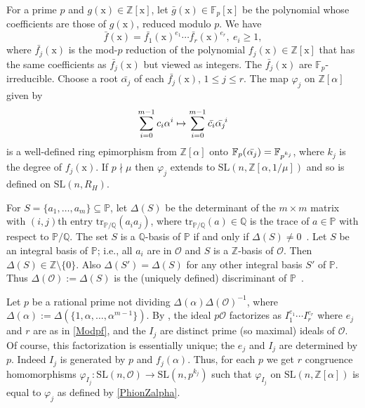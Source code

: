 \documentclass[11pt]{amsart}
\theoremstyle{definition}
\theoremstyle{remark}
\newcommand{\F}{\mathbb{F}}
\newcommand{\Z}{\mathbb{Z}}
\newcommand{\Q}{\mathbb{Q}}
\renewcommand{\P}{\mathbb{P}}
\newcommand{\SL}{\mathrm{SL}}
\newcommand{\tr}{\mathrm{tr}}
\begin{document}
For a prime $p$ and $g(\mathrm{x})\in \allowbreak\Z[\mathrm{x}]$, 
let $\bar{g}(\mathrm{x})\in \allowbreak\F_p[\mathrm{x}]$ be the
polynomial whose coefficients are those of $g(\mathrm{x})$,
reduced modulo $p$. We have 
\begin{equation}
\label{Modpf}
\bar{f}(\mathrm{x})=\allowbreak
 \bar{f_1}(\mathrm{x})^{e_1} \cdots \bar{f_r}(\mathrm{x})^{e_r}, \  
 e_i\geq 1, 
\end{equation} 
where $\bar{f_j}(\mathrm{x})$ is the mod-$p$ reduction of the 
polynomial $f_j(\mathrm{x}) \in 
\allowbreak \Z[\mathrm{x}]$ that has the same coefficients as 
$\bar{f_j}(\mathrm{x})$ but viewed as integers. 
The $\bar{f_j}(\mathrm{x})$ are $\F_p$-irreducible. Choose a root 
$\bar{\alpha_j}$ of each $\bar{f_j}(\mathrm{x})$, $1\leq j \leq r$. 
The map $\varphi_j$ on $\Z[\alpha]$ given by
\begin{equation}
\label{PhionZalpha}
\sum_{i=0}^{m-1}c_i\alpha^i \mapsto
 \sum_{i=0}^{m-1}\bar{c_i}   \bar{\alpha_j}^{\hspace{-1pt} i}
\end{equation}
is a well-defined ring epimorphism from $\Z[\alpha]$ onto 
$\F_p( \hspace{.5pt} \bar{\alpha_j}) = \F_{p^{k_j}}$, where $k_j$ 
is the degree of $f_j(\mathrm{x})$. If $p\nmid \mu$ then 
$\varphi_j$ extends to $\SL(n,\Z[\alpha, 1/\mu])$ and so is 
defined on $\SL(n,R_H)$.

For $S=\{a_1, \ldots , a_m\} \subseteq\P$, let $\Delta(S)$ be the determinant 
of the  $m \times m$ matrix with $(i,j)$th entry $\tr_{\P/\Q}(a_ia_j)$, where 
$\tr_{\P/\Q}(a)\in \Q$ is the trace of $a \in \P$ with respect to $\P/\Q$. The set 
$S$ is a $\Q$-basis of $\P$ if and only if $\Delta(S) \neq 0$~\cite[p.~342]{Koch}.
 Let $S$ be an integral basis of $\P$; i.e., all $a_i$ are in $\mathcal O$ and 
$S$ is a $\Z$-basis of $\mathcal O$. Then $\Delta(S)\in \Z\setminus\{0\}$.
 Also $\Delta(S') = \Delta(S)$ for any other integral basis $S'$ of $\P$. Thus 
$\Delta(\mathcal{O}):= \Delta(S)$ is the (uniquely defined) discriminant
 of $\P$~\cite[pp.~44--45]{Koch}. 

Let $p$ be a rational prime not dividing $\Delta(\alpha)\Delta(\mathcal{O})^{-1}$,
where $\Delta(\alpha) := \Delta(\{1, \alpha, \ldots , \allowbreak \alpha^{m-1}\})$.
 By \cite[Theorem~3.8.2]{Koch}, the ideal $p\mathcal{O}$ factorizes as 
$I_1^{e_1} \cdots I_r^{e_r}$ where $e_j$ and $r$ are as in \eqref{Modpf}, and the 
$I_j$ are distinct prime (so maximal) ideals of $\mathcal{O}$. Of course, this 
factorization is essentially unique; the $e_j$ and $I_j$ are determined by $p$.
Indeed $I_j$ is generated by $p$ and $f_j(\alpha)$. Thus, for each $p$ we get $r$ 
congruence homomorphisms $\varphi_{I_j}\colon \allowbreak \mathrm{SL}(n, \mathcal{O}) 
\rightarrow \mathrm{SL}(n, p^{k_j})$ such that $\varphi_{I_j}$
on $\SL(n,\Z[\alpha])$ is equal to $\varphi_j$ as defined by \eqref{PhionZalpha}. 
\end{document}
